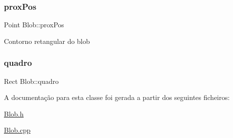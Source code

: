 \subsubsection{\texorpdfstring{prox\+Pos}{proxPos}}
{\footnotesize\ttfamily Point Blob\+::prox\+Pos}

Contorno retangular do blob \mbox{\label{class_blob_aa6387723adb0b9bc5972cf68cc85f4b3}} 
\subsubsection{\texorpdfstring{quadro}{quadro}}
{\footnotesize\ttfamily Rect Blob\+::quadro}



A documentação para esta classe foi gerada a partir dos seguintes ficheiros\+:\begin{DoxyCompactItemize}
\item 
\hyperlink{_blob_8h}{Blob.\+h}\item 
\hyperlink{_blob_8cpp}{Blob.\+cpp}\end{DoxyCompactItemize}
